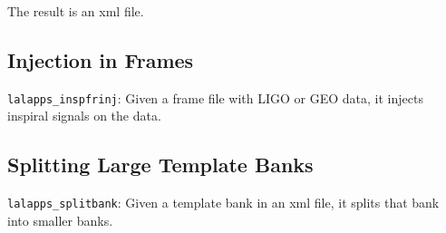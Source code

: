   The result is an xml file.

\subsection{Injection in Frames}

\texttt{lalapps\_inspfrinj}: Given a frame file with LIGO or GEO data, it
injects inspiral signals on the data.


\subsection{Splitting Large Template Banks}

\texttt{lalapps\_splitbank}: Given a template bank in an xml file, it splits
that bank into smaller banks.

\clearpage


\clearpage


\clearpage


\clearpage


\clearpage


\clearpage


\clearpage


\clearpage


\clearpage


\clearpage


\clearpage


%
%
